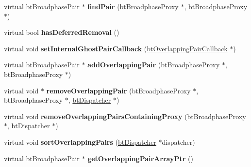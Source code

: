 \begin{DoxyCompactItemize}
\item 
\mbox{\label{classbtNullPairCache_a1932ebc5d729f0f31528f7647b1c0ab9}} 
virtual bt\+Broadphase\+Pair $\ast$ {\bfseries find\+Pair} (bt\+Broadphase\+Proxy $\ast$, bt\+Broadphase\+Proxy $\ast$)
\item 
\mbox{\label{classbtNullPairCache_a937a29216d8c7585d8c710f84745bd1b}} 
virtual bool {\bfseries has\+Deferred\+Removal} ()
\item 
\mbox{\label{classbtNullPairCache_a5cb33e9d3694c71fe68038580da8cc69}} 
virtual void {\bfseries set\+Internal\+Ghost\+Pair\+Callback} (\hyperlink{classbtOverlappingPairCallback}{bt\+Overlapping\+Pair\+Callback} $\ast$)
\item 
\mbox{\label{classbtNullPairCache_a76137e4519323ff5589d5702752bc2cb}} 
virtual bt\+Broadphase\+Pair $\ast$ {\bfseries add\+Overlapping\+Pair} (bt\+Broadphase\+Proxy $\ast$, bt\+Broadphase\+Proxy $\ast$)
\item 
\mbox{\label{classbtNullPairCache_a436b8c6da50f69e53425abb7cdc7976c}} 
virtual void $\ast$ {\bfseries remove\+Overlapping\+Pair} (bt\+Broadphase\+Proxy $\ast$, bt\+Broadphase\+Proxy $\ast$, \hyperlink{classbtDispatcher}{bt\+Dispatcher} $\ast$)
\item 
\mbox{\label{classbtNullPairCache_a87574120b56624b329c0a0faf7fd5461}} 
virtual void {\bfseries remove\+Overlapping\+Pairs\+Containing\+Proxy} (bt\+Broadphase\+Proxy $\ast$, \hyperlink{classbtDispatcher}{bt\+Dispatcher} $\ast$)
\item 
\mbox{\label{classbtNullPairCache_a12eeb9eea98cf0314d59e65feb95d344}} 
virtual void {\bfseries sort\+Overlapping\+Pairs} (\hyperlink{classbtDispatcher}{bt\+Dispatcher} $\ast$dispatcher)
\item 
\mbox{\label{classbtNullPairCache_a4ec1efad728fc0578fb780d1b99a4fe3}} 
virtual bt\+Broadphase\+Pair $\ast$ {\bfseries get\+Overlapping\+Pair\+Array\+Ptr} ()
\item 
\mbox{\label{classbtNullPairCache_a4172f88610db99f01fa406575bf2bb30}} 

\end{DoxyCompactItemize}
